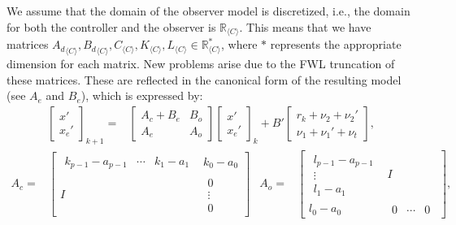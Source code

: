 \documentclass[a4paper,UKenglish]{lipics-v2018}
\newcommand{\mat}[1]{{#1}}
\renewcommand{\vec}[1]{{#1}}
\begin{document}
We assume that the domain of the observer model is discretized, 
i.e., the domain for both the controller and the observer is $\mathbb{R}_{\langle C \rangle}$.
This means that we have matrices 
${\mat{A}_d}_{\langle C
\rangle},{\mat{B}_d}_{\langle C \rangle},\mat{C}_{\langle C \rangle},
\mat{K}_{\langle C \rangle}, \mat{L}_{\langle C \rangle} \in
\mathbb{R}_{\langle C \rangle}^*$, 
where $*$ represents the appropriate dimension for each matrix.
New problems arise due to the FWL truncation of these matrices. 
These are reflected in the canonical form of the resulting model (see $\mat{A}_e$ and $\mat{B}_e$),
which is expressed by:
%
{\setlength{\belowdisplayskip}{2pt}
\begin{align}
\left [\begin{array}{c}\vec{x}'\\ \vec{x}_e' \end{array}\right]_{k+1}
=& \left [\begin{array}{cc}\mat{A}_{c}+\mat{B}_{e}&\mat{B}_{o}\\ \mat{A}_{e}&\mat{A}_{o}\end{array}\right]
\left [\begin{array}{c}\vec{x}'\\ \vec{x}_e' \end{array}\right]_k
+\mat{B}'\left [\begin{array}{c} \vec{r}_k + \nu_2+\nu_2'\\ \nu_1+\nu_1'+\nu_t\end{array}\right], %
\label{eq:observer_LTI_FWL_cf}
\end{align}
}
{\setlength{\abovedisplayskip}{2pt}
\setlength{\belowdisplayskip}{2pt}
\begin{align*}
\mat{A}_c=&\left[\begin{array}{cc}
\begin{array}{ccc}k_{p-1}-a_{p-1}&\cdots&k_1-a_1\end{array}&k_0-a_0\\
\mat{I}&\begin{array}{c}0\\ \vdots \\ 0\end{array}
\end{array}\right]&
\mat{A}_o=&\left[\begin{array}{cc}
\begin{array}{c}l_{p-1}-a_{p-1}\\ \vdots\\ l_1-a_1\end{array}&\mat{I}\\
l_0-a_0&\begin{array}{ccc}0&\cdots&0\end{array}
\end{array}\right], 
\end{align*}}
\end{document}
